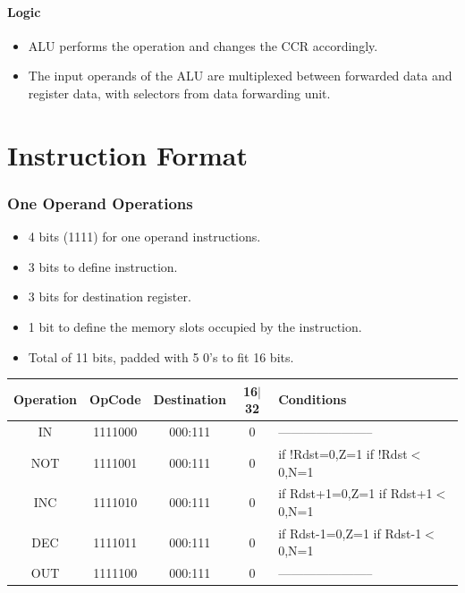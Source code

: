 \documentclass[12pt]{report}
\begin{document}
\subsection{Logic}
\begin{itemize}
    \item ALU performs the operation and changes the CCR accordingly.
    \item The input operands of the ALU are multiplexed between forwarded data and register data, with selectors from data forwarding unit.
\end{itemize}

\part{Instruction Format}

\section{One Operand Operations}
\begin{itemize}
    \item 4 bits (1111) for one operand instructions.
    \item 3 bits to define instruction.
    \item 3 bits for destination register.
    \item 1 bit to define the memory slots occupied by the instruction.
    \item Total of 11 bits, padded with 5 0's to fit 16 bits.
\end{itemize}
\begin{center}
 \begin{tabular}{||c| c| c| c| p{40mm}||} 
 \hline
 Operation & OpCode & Destination & 16$|$32 & Conditions  \\ [0.5ex] 
 \hline\hline
 IN & 1111000 & 000:111 & 0 & ----------------------- \\
 \hline
 NOT & 1111001 & 000:111 & 0 & if !Rdst=0,Z=1 \newline if !Rdst$<$0,N=1 \\
 \hline
 INC & 1111010 & 000:111 & 0 & if Rdst+1=0,Z=1 \newline if Rdst+1$<$0,N=1 \\
 \hline
 DEC & 1111011 & 000:111 & 0 & if Rdst-1=0,Z=1 \newline if Rdst-1$<$0,N=1 \\
 \hline
 OUT & 1111100 & 000:111 & 0 & ----------------------- \\
 \hline
\end{tabular}
\end{center}
\end{document}

